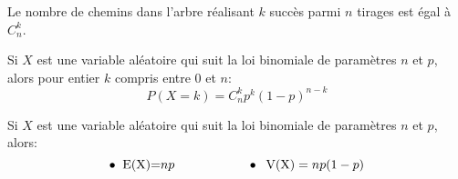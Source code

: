 \begin{remark}
 Le nombre de chemins dans l'arbre réalisant $ k $ succès  parmi $ n $ tirages est égal à  $ C_{n}^{k} $.
  \end{remark}

\begin{property}[Admis]
Si $ X $ est une variable aléatoire qui suit la loi binomiale de paramètres $ n$ et $ p$, alors pour entier $ k $ compris entre $ 0$ et $n $: $$ P(X=k)=C_{n}^{k}p^{k}(1-p)^{n-k} $$
  \end{property} 
  \begin{property}[Admis]
 Si $ X $ est une variable aléatoire qui suit la loi binomiale de paramètres $ n$ et $ p$, alors:
\[\bullet\;\; \text{E(X)=}np \hspace*{2cm} \bullet \;\;\text{V(X)}=np(1-p)\]
\end{property} 

